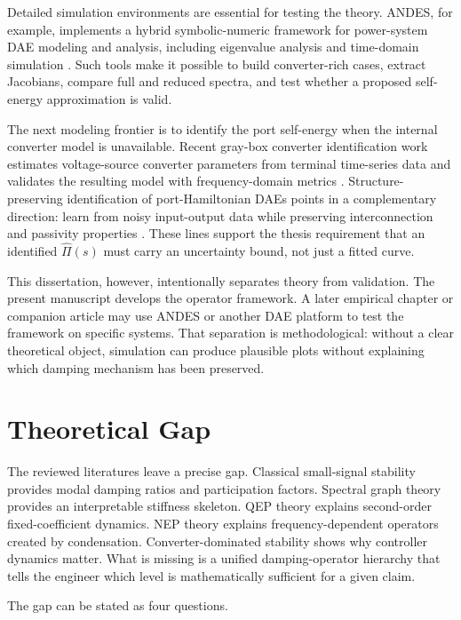 Detailed simulation environments are essential for testing the theory. ANDES,
for example, implements a hybrid symbolic-numeric framework for power-system
DAE modeling and analysis, including eigenvalue analysis and time-domain
simulation \cite{cui2021andes}. Such tools make it possible to build
converter-rich cases, extract Jacobians, compare full and reduced spectra, and
test whether a proposed self-energy approximation is valid.

The next modeling frontier is to identify the port self-energy when the
internal converter model is unavailable. Recent gray-box converter
identification work estimates voltage-source converter parameters from terminal
time-series data and validates the resulting model with frequency-domain
metrics \cite{darii2026graybox}. Structure-preserving identification of
port-Hamiltonian DAEs points in a complementary direction: learn from noisy
input-output data while preserving interconnection and passivity properties
\cite{hagelaars2026identification}. These lines support the thesis requirement
that an identified \(\widehat\Pi(s)\) must carry an uncertainty bound, not just
a fitted curve.

This dissertation, however, intentionally separates theory from validation.
The present manuscript develops the operator framework. A later empirical
chapter or companion article may use ANDES or another DAE platform to test the
framework on specific systems. That separation is methodological: without a
clear theoretical object, simulation can produce plausible plots without
explaining which damping mechanism has been preserved.

\section{Theoretical Gap}

The reviewed literatures leave a precise gap. Classical small-signal stability
provides modal damping ratios and participation factors. Spectral graph theory
provides an interpretable stiffness skeleton. QEP theory explains
second-order fixed-coefficient dynamics. NEP theory explains frequency-dependent
operators created by condensation. Converter-dominated stability shows why
controller dynamics matter. What is missing is a unified damping-operator
hierarchy that tells the engineer which level is mathematically sufficient for
a given claim.

The gap can be stated as four questions.


